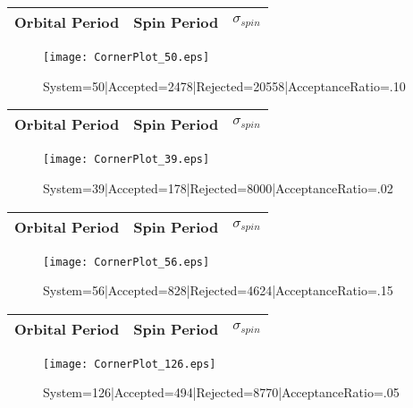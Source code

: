 \documentclass[10pt]{article}
\begin{document}
\begin{center}
        \begin{tabular}{|c|c|c|}
        \hline
Orbital Period & Spin Period & $\sigma_{spin}$ \\
 \hline
        \end{tabular}
        \end{center}
\begin{figure}[h] 
        \texttt{[image: CornerPlot\_50.eps]}
        \caption{System=50|Accepted=2478|Rejected=20558|AcceptanceRatio=.10}
        \label{S50}
        \centering
        \end{figure}
\begin{center}
        \begin{tabular}{|c|c|c|}
        \hline
Orbital Period & Spin Period & $\sigma_{spin}$ \\
 \hline
        \end{tabular}
        \end{center}
\begin{figure}[h] 
        \texttt{[image: CornerPlot\_39.eps]}
        \caption{System=39|Accepted=178|Rejected=8000|AcceptanceRatio=.02}
        \label{S39}
        \centering
        \end{figure}
\begin{center}
        \begin{tabular}{|c|c|c|}
        \hline
Orbital Period & Spin Period & $\sigma_{spin}$ \\
 \hline
        \end{tabular}
        \end{center}
\begin{figure}[h] 
        \texttt{[image: CornerPlot\_56.eps]}
        \caption{System=56|Accepted=828|Rejected=4624|AcceptanceRatio=.15}
        \label{S56}
        \centering
        \end{figure}
\begin{center}
        \begin{tabular}{|c|c|c|}
        \hline
Orbital Period & Spin Period & $\sigma_{spin}$ \\
 \hline
        \end{tabular}
        \end{center}
\begin{figure}[h] 
        \texttt{[image: CornerPlot\_126.eps]}
        \caption{System=126|Accepted=494|Rejected=8770|AcceptanceRatio=.05}
        \label{S126}
        \centering
        \end{figure}
\end{document}
